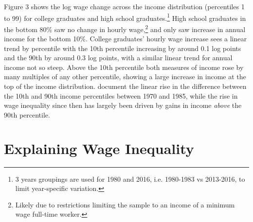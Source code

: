 \documentclass[notitlepage,12pt]{article}
\begin{document}
Figure 3 shows the log wage change across the income distribution (percentiles 1 to 99) for college graduates and high school graduates.\footnote{3 years groupings are used for 1980 and 2016, i.e. 1980-1983 vs 2013-2016, to limit year-specific variation.}  High school graduates in the bottom 80\% saw no change in hourly wage,\footnote{Likely due to restrictions limiting the sample to an income of a minimum wage full-time worker.} and only saw increase in annual income for the bottom 10\%.  College graduates' hourly wage increase sees a linear trend by percentile with the 10th percentile increasing by around 0.1 log points and the 90th by around 0.3 log points, with a similar linear trend for annual income not so steep.  Above the 10th percentile both measures of income rose by many multiples of any other percentile, showing a large increase in income at the top of the income distribution.  \cite{juhn1993wage} document the linear rise in the difference between the 10th and 90th income percentiles between 1970 and 1985, while the rise in wage inequality since then has largely been driven by gains in income \textit{above} the 90th percentile.

\section{Explaining Wage Inequality}
\end{document}
